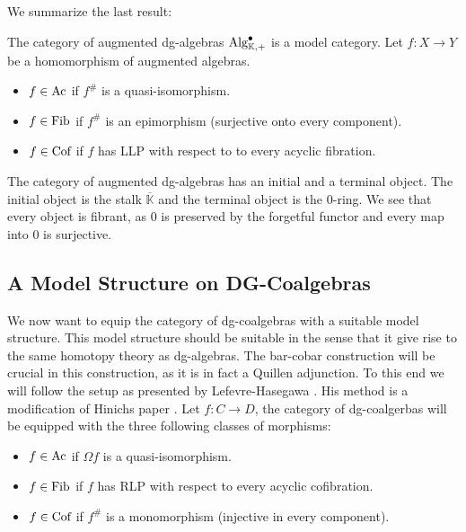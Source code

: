\documentclass[../thesis.tex]{subfiles}
\begin{document}
            We summarize the last result:

            The category of augmented dg-algebras $\tt{Alg}^\bullet_{\mathbb{K},+}$ is a model category. Let $f:X\rightarrow Y$ be a homomorphism of augmented algebras. 
            \begin{itemize}
                \item $f\in \tt{Ac}$ if $f^\#$ is a quasi-isomorphism.
                \item $f\in \tt{Fib}$ if $f^\#$ is an epimorphism (surjective onto every component).
                \item $f\in \tt{Cof}$ if $f$ has LLP with respect to to every acyclic fibration.
            \end{itemize}
            
            The category of augmented dg-algebras has an initial and a terminal object. The initial object is the stalk $\overline{\mathbb{K}}$ and the terminal object is the $0$-ring. We see that every object is fibrant, as $0$ is preserved by the forgetful functor and every map into $0$ is surjective.
            
    \subsection{A Model Structure on DG-Coalgebras}

            We now want to equip the category of dg-coalgebras with a suitable model structure. This model structure should be suitable in the sense that it give rise to the same homotopy theory as dg-algebras. The bar-cobar construction will be crucial in this construction, as it is in fact a Quillen adjunction. To this end we will follow the setup as presented by Lefevre-Hasegawa \cite{LefevreHasegawa03}. His method is a modification of Hinichs paper \cite{Hinich01}.
            Let $f: C \rightarrow D$, the category of dg-coalgerbas will be equipped with the three following classes of morphisms:
            \begin{itemize}
                \item $f\in \tt{Ac}$ if $\Omega f$ is a quasi-isomorphism.
                \item $f\in \tt{Fib}$ if $f$ has RLP with respect to every acyclic cofibration.
                \item $f\in \tt{Cof}$ if $f^\#$ is a monomorphism (injective in every component).
            \end{itemize}
\end{document}
